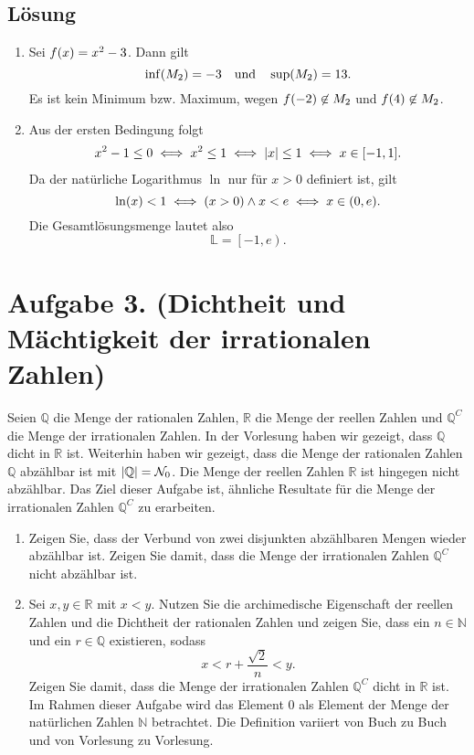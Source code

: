 \documentclass[german,12pt]{homework}
\newcommand{\NN}{\mathbb{N}}
\newcommand{\QQ}{\mathbb{Q}}
\newcommand{\RR}{\mathbb{R}}
\newcommand{\LL}{\mathbb{L}}
\DeclarePairedDelimiter{\absolute}{\lvert}{\rvert}
\DeclarePairedDelimiter{\enbrace}{(}{)}
\DeclarePairedDelimiter{\benbrace}{[}{]}
\begin{document}
    \subsection*{Lösung}
    \begin{enumerate}
        \item Sei \(f\enbrace*{x} = x^2 - 3\). Dann gilt
        \[\inf\enbrace*{M_2} = -3 \quad \text{und} \quad \sup\enbrace*{M_2} =
        13.\]
        Es ist kein Minimum bzw. Maximum, wegen \(f\enbrace*{-2} \not\in M_2\)
        und \(f\enbrace*{4} \not\in M_2\).
        \item Aus der ersten Bedingung folgt
        \begin{align*}
            x^2 - 1 \le 0 \iff x^2 \le 1 \iff \absolute*{x} \le 1 \iff x \in
            \benbrace*{-1, 1}.
        \end{align*}
        Da der natürliche Logarithmus \(\ln\) nur für \(x > 0\) definiert ist,
        gilt
        \[\ln\enbrace*{x} < 1 \iff \enbrace*{x > 0} \land x < e \iff x \in
        \enbrace*{0, e}.\]
        Die Gesamtlösungsmenge lautet also
        \[\LL = \left[-1, e\right).\]
    \end{enumerate}

    \section*{Aufgabe 3. (Dichtheit und Mächtigkeit der irrationalen Zahlen)}

    \begin{problem}
        Seien \(\QQ\) die Menge der rationalen Zahlen, \(\RR\) die Menge der
        reellen Zahlen und \(\QQ^C\) die Menge der irrationalen Zahlen. In der
        Vorlesung haben wir gezeigt, dass \(\QQ\) dicht in \(\RR\) ist.
        Weiterhin haben wir gezeigt, dass die Menge der rationalen Zahlen
        \(\QQ\) abzählbar ist mit \(\absolute*{\QQ} = \mathcal{N}_0\). Die
        Menge der reellen Zahlen \(\RR\) ist hingegen nicht abzählbar. Das Ziel
        dieser Aufgabe ist, ähnliche Resultate für die Menge der irrationalen
        Zahlen \(\mathbb{Q}^C\) zu erarbeiten.
        \begin{enumerate}
            \item Zeigen Sie, dass der Verbund von zwei disjunkten abzählbaren
            Mengen wieder abzählbar ist. Zeigen Sie damit, dass die Menge der
            irrationalen Zahlen \(\QQ^C\) nicht abzählbar ist.
            \item Sei \(x, y \in \RR\) mit \(x < y\). Nutzen Sie die
            archimedische Eigenschaft der reellen Zahlen und die Dichtheit der
            rationalen Zahlen und zeigen Sie, dass ein \(n \in \NN\) und ein
            \(r \in \QQ\) existieren, sodass
            \[x < r + \frac{\sqrt{2}}{n} < y.\]
            Zeigen Sie damit, dass die Menge der irrationalen Zahlen \(\QQ^C\)
            dicht in \(\RR\) ist. Im Rahmen dieser Aufgabe wird das Element
            \(0\) als Element der Menge der natürlichen Zahlen \(\NN\)
            betrachtet. Die Definition variiert von Buch zu Buch und von
            Vorlesung zu Vorlesung.
        \end{enumerate}
    \end{problem}
\end{document}
